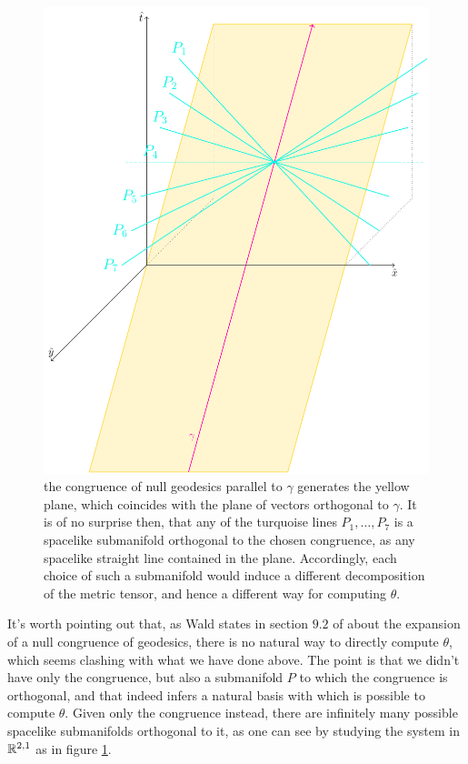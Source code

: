 \begin{figure}
	\caption[]{the congruence of null geodesics parallel to \(\gamma\) generates the yellow plane, which coincides with the plane of vectors orthogonal to \(\gamma\). It is of no surprise then, that any of the turquoise lines \(P_1, \ldots, P_7\) is a spacelike submanifold orthogonal to the chosen congruence, as any spacelike straight line contained in the plane. Accordingly, each choice of such a submanifold would induce a different decomposition of the metric tensor, and hence a different way for computing \(\theta\).}
	\label{fig:expansion-computation}
	\centering
	\includegraphics[scale=0.55]{Immagini/expansion-computation/expansion-computation.pdf}
\end{figure}

\begin{remark}
	It's worth pointing out that, as Wald states in section \(9.2\) of \cite{wald2010general} about the expansion of a null congruence of geodesics, there is no natural way to directly compute \(\theta\), which seems clashing with what we have done above. The point is that we didn't have only the congruence, but also a submanifold \(P\) to which the congruence is orthogonal, and that indeed infers a natural basis with which is possible to compute \(\theta\). Given only the congruence instead, there are infinitely many possible spacelike submanifolds orthogonal to it, as one can see by studying the system in \({\mathbb{R}}^{2,1}\) as in figure \ref{fig:expansion-computation}.
\end{remark}


